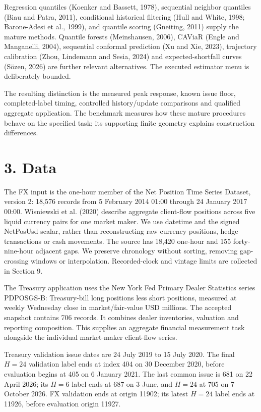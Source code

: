 \documentclass[10pt,a4paper]{article}
\begin{document}
Regression quantiles (Koenker and Bassett, 1978), sequential neighbor quantiles (Biau and Patra, 2011), conditional historical filtering (Hull and White, 1998; Barone-Adesi et al., 1999), and quantile scoring (Gneiting, 2011) supply the mature methods. Quantile forests (Meinshausen, 2006), CAViaR (Engle and Manganelli, 2004), sequential conformal prediction (Xu and Xie, 2023), trajectory calibration (Zhou, Lindemann and Sesia, 2024) and expected-shortfall curves (Sözen, 2026) are further relevant alternatives. The executed estimator menu is deliberately bounded.

The resulting distinction is the measured peak response, known issue floor, completed-label timing, controlled history/update comparisons and qualified aggregate application. The benchmark measures how these mature procedures behave on the specified task; its supporting finite geometry explains construction differences.

\section*{3. Data}
The FX input is the one-hour member of the Net Position Time Series Dataset, version 2: 18,576 records from 5 February 2014 01:00 through 24 January 2017 00:00. Wisniewski et al. (2020) describe aggregate client-flow positions across five liquid currency pairs for one market maker. We use datetime and the signed NetPosUsd scalar, rather than reconstructing raw currency positions, hedge transactions or cash movements. The source has 18,420 one-hour and 155 forty-nine-hour adjacent gaps. We preserve chronology without sorting, removing gap-crossing windows or interpolation. Recorded-clock and vintage limits are collected in Section 9.

The Treasury application uses the New York Fed Primary Dealer Statistics series PDPOSGS-B: Treasury-bill long positions less short positions, measured at weekly Wednesday close in market/fair-value USD millions. The accepted snapshot contains 706 records. It combines dealer inventories, valuation and reporting composition. This supplies an aggregate financial measurement task alongside the individual market-maker client-flow series.

Treasury validation issue dates are 24 July 2019 to 15 July 2020. The final \(H=24\) validation label ends at index 404 on 30 December 2020, before evaluation begins at 405 on 6 January 2021. The last common issue is 681 on 22 April 2026; its \(H=6\) label ends at 687 on 3 June, and \(H=24\) at 705 on 7 October 2026. FX validation ends at origin 11902; its latest \(H=24\) label ends at 11926, before evaluation origin 11927.
\end{document}
